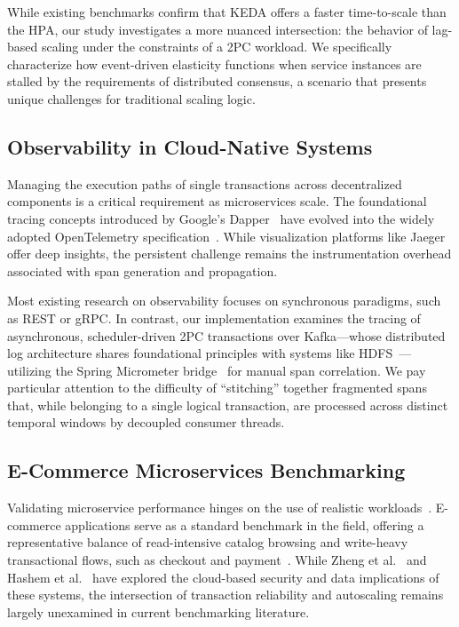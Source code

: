 \documentclass[]{USG}
\begin{document}
While existing benchmarks confirm that KEDA offers a faster time-to-scale than the HPA, our study investigates a more nuanced intersection: the behavior of lag-based scaling under the constraints of a 2PC workload. We specifically characterize how event-driven elasticity functions when service instances are stalled by the requirements of distributed consensus, a scenario that presents unique challenges for traditional scaling logic.

\subsection{Observability in Cloud-Native Systems}
\label{subsec:rw-observability}
Managing the execution paths of single transactions across decentralized components is a critical requirement as microservices scale. The foundational tracing concepts introduced by Google’s Dapper~\cite{dapper2010} have evolved into the widely adopted OpenTelemetry specification~\cite{opentelemetry2024}. While visualization platforms like Jaeger~\cite{jaeger2019} offer deep insights, the persistent challenge remains the instrumentation overhead associated with span generation and propagation. 

Most existing research on observability focuses on synchronous paradigms, such as REST or gRPC. In contrast, our implementation examines the tracing of asynchronous, scheduler-driven 2PC transactions over Kafka---whose distributed log architecture shares foundational principles with systems like HDFS~\cite{kreps2013log}---utilizing the Spring Micrometer bridge~\cite{micrometer2024} for manual span correlation. We pay particular attention to the difficulty of ``stitching'' together fragmented spans that, while belonging to a single logical transaction, are processed across distinct temporal windows by decoupled consumer threads.

\subsection{E-Commerce Microservices Benchmarking}
\label{subsec:rw-benchmarking}

Validating microservice performance hinges on the use of realistic workloads~\cite{ueda2016workload}. E-commerce applications serve as a standard benchmark in the field, offering a representative balance of read-intensive catalog browsing and write-heavy transactional flows, such as checkout and payment~\cite{gan2019deathstar}. While Zheng et al.~\cite{zheng2019survey} and Hashem et al.~\cite{hashem2015rise} have explored the cloud-based security and data implications of these systems, the intersection of transaction reliability and autoscaling remains largely unexamined in current benchmarking literature. 
\end{document}
